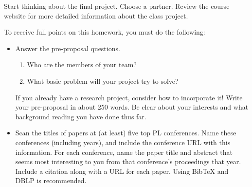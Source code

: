 \documentclass[12pt]{exam}
\begin{document}
\begin{questions}
\question Start thinking about the final project. Choose a partner. Review the course website for more detailed information about the class project.

To receive full points on this homework, you must do the following:

\begin{itemize}
\item Answer the pre-proposal questions.
\begin{enumerate}
\item Who are the members of your team?
\item What basic problem will your project try to solve?
\end{enumerate}
If you already have a research project, consider how to incorporate it!
%
Write your pre-proposal in about 250 words.
%
Be clear about your interests and what background reading you have done thus far.

\item Scan the titles of papers at (at least) five top PL conferences.
%
Name these conferences (including years), and include the conference
URL with this information.
%
For each conference, name the paper title and abstract that seems most
interesting to you from that conference's proceedings that year.
%
Include a citation along with a URL for each paper. Using BibTeX and DBLP is recommended.
\end{itemize}

\end{questions}
\end{document}
